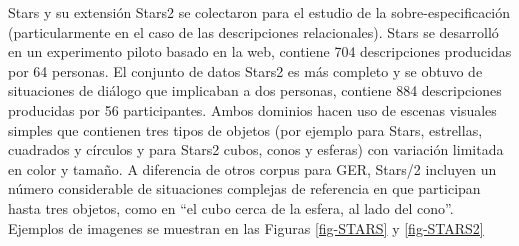 \label{sec:corpusSTARS}
Stars \cite{stars-mutual-disamb} y su extensi\'on Stars2 se colectaron para el estudio de la sobre-especificaci\'on (particularmente en el caso de las descripciones relacionales). Stars se desarroll\'o en un experimento piloto basado en la web, contiene 704 descripciones producidas por 64 personas. El conjunto de datos Stars2 es m\'as completo y se obtuvo de situaciones de di\'alogo que implicaban a dos personas, contiene 884 descripciones producidas por 56 participantes. Ambos dominios hacen uso de escenas visuales simples que contienen tres tipos de objetos (por ejemplo para Stars, estrellas, cuadrados y c\'irculos y para Stars2 cubos, conos y esferas) con variaci\'on limitada en color y tama\~no. A diferencia de otros corpus para GER, Stars/2 incluyen un n\'umero considerable de situaciones complejas de referencia en que participan hasta tres objetos, como en ``el cubo cerca de la esfera, al lado del cono''. Ejemplos de imagenes se muestran en las Figuras \ref{fig-STARS} y \ref{fig-STARS2}


